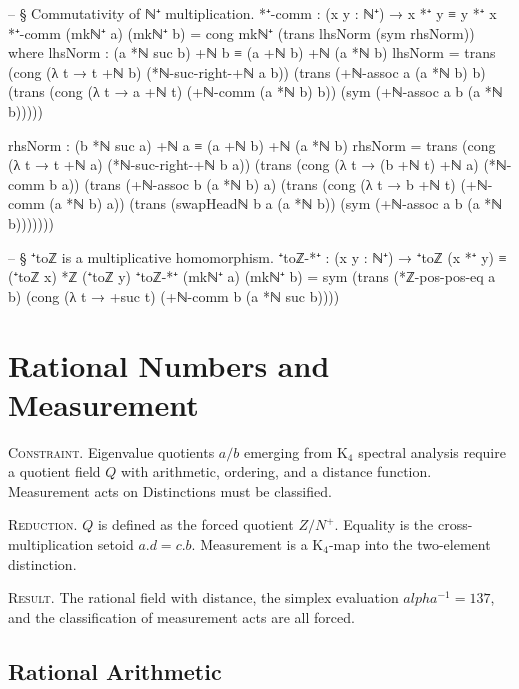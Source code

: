 \documentclass[11pt,a4paper]{book}
\def\alpha{alpha}%
\def\cdot{.}%
\def\mathbb#1{#1}%
\begin{document}
\begin{code}
-- § Commutativity of ℕ⁺ multiplication.
*⁺-comm : (x y : ℕ⁺) → x *⁺ y ≡ y *⁺ x
*⁺-comm (mkℕ⁺ a) (mkℕ⁺ b) =
  cong mkℕ⁺ (trans lhsNorm (sym rhsNorm))
  where
    lhsNorm : (a *ℕ suc b) +ℕ b ≡ (a +ℕ b) +ℕ (a *ℕ b)
    lhsNorm =
      trans
        (cong (λ t → t +ℕ b) (*ℕ-suc-right-+ℕ a b))
        (trans
          (+ℕ-assoc a (a *ℕ b) b)
          (trans
            (cong (λ t → a +ℕ t) (+ℕ-comm (a *ℕ b) b))
            (sym (+ℕ-assoc a b (a *ℕ b)))))

    rhsNorm : (b *ℕ suc a) +ℕ a ≡ (a +ℕ b) +ℕ (a *ℕ b)
    rhsNorm =
      trans
        (cong (λ t → t +ℕ a) (*ℕ-suc-right-+ℕ b a))
        (trans
          (cong (λ t → (b +ℕ t) +ℕ a) (*ℕ-comm b a))
          (trans
            (+ℕ-assoc b (a *ℕ b) a)
            (trans
              (cong (λ t → b +ℕ t) (+ℕ-comm (a *ℕ b) a))
              (trans
                (swapHeadℕ b a (a *ℕ b))
                (sym (+ℕ-assoc a b (a *ℕ b)))))))

-- § ⁺toℤ is a multiplicative homomorphism.
⁺toℤ-*⁺ : (x y : ℕ⁺) → ⁺toℤ (x *⁺ y) ≡ (⁺toℤ x) *ℤ (⁺toℤ y)
⁺toℤ-*⁺ (mkℕ⁺ a) (mkℕ⁺ b) =
  sym
    (trans
      (*ℤ-pos-pos-eq a b)
      (cong (λ t → +suc t) (+ℕ-comm b (a *ℕ suc b))))
\end{code}

\chapter{Rational Numbers and Measurement}

\textsc{Constraint.}
Eigenvalue quotients $a/b$ emerging from K$_4$ spectral analysis require
a quotient field $\mathbb{Q}$ with arithmetic, ordering, and a distance function.
Measurement acts on Distinctions must be classified.

\textsc{Reduction.}
$\mathbb{Q}$ is defined as the forced quotient $\mathbb{Z}/\mathbb{N}^+$.
Equality is the cross-multiplication setoid $a \cdot d = c \cdot b$.
Measurement is a K$_4$-map into the two-element distinction.

\textsc{Result.}
The rational field with distance, the simplex evaluation $\alpha^{-1} = 137$,
and the classification of measurement acts are all forced.

\section{Rational Arithmetic}
\end{document}
